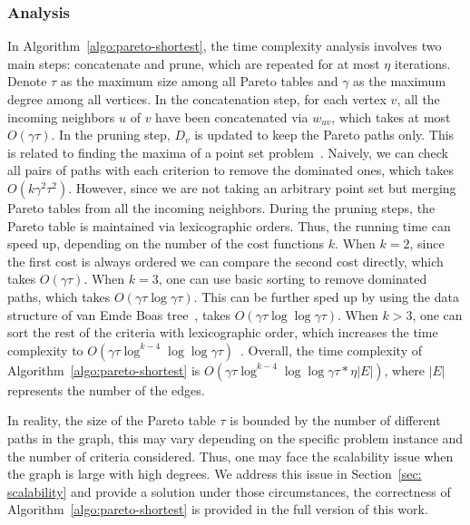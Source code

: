 \subsubsection{Analysis} In Algorithm~\ref{algo:pareto-shortest}, the time complexity analysis involves two main steps: concatenate and prune, which are repeated for at most $\eta$ iterations. Denote $\tau$ as the maximum size among all Pareto tables and $\gamma$ as the maximum degree among all vertices. In the concatenation step, for each vertex $v$, all the incoming neighbors $u$ of $v$ have been concatenated via $w_{uv}$, which takes at most $O(\gamma \tau)$. In the pruning step, $D_v$ is updated to keep the Pareto paths only. This is related to finding the maxima of a point set problem~\cite{preparata2012computational}. Naively, we can check all pairs of paths with each criterion to remove the dominated ones, which takes $O(k\gamma^2 \tau^2)$. However, since we are not taking an arbitrary point set but merging Pareto tables from all the incoming neighbors. During the pruning steps, the Pareto table is maintained via lexicographic orders. Thus, the running time can speed up, depending on the number of the cost functions $k$. When $k=2$, since the first cost is always ordered we can compare the second cost directly, which takes $O(\gamma \tau)$. When $k=3$, one can use basic sorting to remove dominated paths, which takes $O(\gamma \tau \log \gamma \tau)$. This can be further sped up by using the data structure of van Emde Boas tree~\cite{karlsson1988scanline}, takes $O(\gamma \tau \log \log \gamma \tau)$. When $k>3$, one can sort the rest of the criteria with lexicographic order, which increases the time complexity to $O(\gamma \tau \log^{k-4}\log\log \gamma \tau)$~\cite{gabow1984scaling}. Overall, the time complexity of Algorithm~\ref{algo:pareto-shortest} is $O(\gamma \tau \log^{k-4}\log\log \gamma \tau * \eta |E|)$, where $|E|$ represents the number of the edges. 

In reality, the size of the Pareto table $\tau$ is bounded by the number of different paths in the graph, this may vary depending on the specific problem instance and the number of criteria considered. Thus, one may face the scalability issue when the graph is large with high degrees. We address this issue in Section~\ref{sec: scalability} and provide a solution under those circumstances, the correctness of Algorithm~\ref{algo:pareto-shortest} is provided in the full version of this work. 

